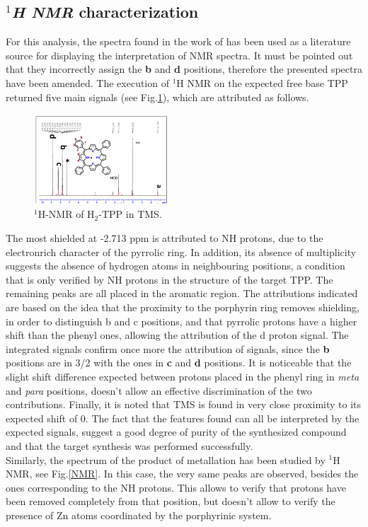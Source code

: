 \documentclass[twoside,twocolumn,9pt]{article}
\begin{document}
\subsection{\textit{$^{1}$H NMR} characterization}
For this analysis, the spectra found in the work of \citet{anjali_zinc-tetraphenylporphyrin_2020} has been used as a literature source for displaying the interpretation of NMR spectra.
It must be pointed out that they incorrectly assign the \textbf{b} and \textbf{d} positions, therefore the presented spectra have been amended.
The execution of $^{1}$H NMR on the expected free base TPP returned five main signals (see Fig.\ref{H2-TPP-NMR}), which are attributed as follows.
\begin{figure}
	\centering
	\includegraphics[width=0.45\textwidth]{1H-NMR-H2-TPP}
	\caption{$^{1}$H-NMR of H$_{2}$-TPP in TMS.}
	\label{H2-TPP-NMR}
\end{figure}
The most shielded at -2.713 ppm is attributed to NH protons, due to the electronrich character of the pyrrolic ring. 
In addition, its absence of multiplicity suggests the absence of hydrogen atoms in neighbouring positions, a condition that is only verified by NH protons in the structure of the target TPP.
The remaining peaks are all placed in the aromatic region.
The attributions indicated are based on the idea that the proximity to the porphyrin ring removes shielding, in order to distinguish b and c positions, and that pyrrolic protons have a higher shift than the phenyl ones, allowing the attribution of the d proton signal.
The integrated signals confirm once more the attribution of signals, since the \textbf{b} positions are in 3/2 with the ones in \textbf{c} and \textbf{d} positions.
It is noticeable that the slight shift difference expected between protons placed in the phenyl ring in \textit{meta} and \textit{para} positions, doesn't allow an effective discrimination of the two contributions.
Finally, it is noted that TMS is found in very close proximity to its expected shift of 0.
The fact that the features found can all be interpreted by the expected signals, suggest a good degree of purity of the synthesized compound and that the target synthesis was performed successfully.\\
Similarly, the spectrum of the product of metallation has been studied by $^{1}$H NMR, see Fig.\ref{NMR}.
In this case, the very same peaks are observed, besides the ones corresponding to the NH protons.
This allows to verify that protons have been removed completely from that position, but doesn't allow to verify the presence of Zn atoms coordinated by the porphyrinic system.
\end{document}
